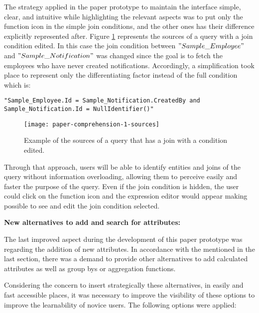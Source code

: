 The strategy applied in the paper prototype to maintain the interface simple, clear, and intuitive while highlighting the relevant aspects was to put only the function icon in the simple join conditions, and the other ones has their difference explicitly represented after. Figure \ref{fig:paperComprehension1Sources} represents the sources of a query with a join condition edited. In this case the join condition between $"Sample\_Employee"$ and $"Sample\_Notification"$ was changed since the goal is to fetch the employees who have never created notifications. Accordingly, a simplification took place to represent only the differentiating factor instead of the full condition which is:

\begin{center}
  \verb|"Sample_Employee.Id = Sample_Notification.CreatedBy and| 
  \\
  \verb|Sample_Notification.Id = NullIdentifier()"|
\end{center}

\begin{figure}[htbp]
	\centering
  \texttt{[image: paper-comprehension-1-sources]}
	\caption{Example of the sources of a query that has a join with a condition edited.}
	\label{fig:paperComprehension1Sources}
\end{figure}

Through that approach, users will be able to identify entities and joins of the query without information overloading, allowing them to perceive easily and faster the purpose of the query. Even if the join condition is hidden, the user could click on the function icon and the expression editor would appear making possible to see and edit the join condition selected.

\medskip

\textbf{New alternatives to add and search for attributes:}

\medskip

The last improved aspect during the development of this paper prototype was regarding the addition of new attributes. In accordance with the mentioned in the last section, there was a demand to provide other alternatives to add calculated attributes as well as group bys or aggregation functions.

Considering the concern to insert strategically these alternatives, in easily and fast accessible places, it was necessary to improve the visibility of these options to improve the learnability of novice users. The following options were applied:


